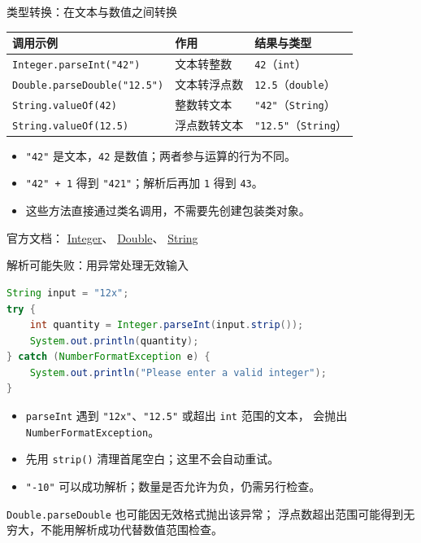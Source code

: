 \documentclass[aspectratio=169]{beamer}
\begin{document}
\begin{frame}{类型转换：在文本与数值之间转换}
  \begin{center}
    \renewcommand{\arraystretch}{1.35}
    \begin{tabular}{lll}
      \textbf{调用示例} & \textbf{作用} & \textbf{结果与类型} \\
      \hline
      \texttt{Integer.parseInt("42")} & 文本转整数 & \texttt{42}（\texttt{int}） \\
      \texttt{Double.parseDouble("12.5")} & 文本转浮点数 & \texttt{12.5}（\texttt{double}） \\
      \texttt{String.valueOf(42)} & 整数转文本 & \texttt{"42"}（\texttt{String}） \\
      \texttt{String.valueOf(12.5)} & 浮点数转文本 & \texttt{"12.5"}（\texttt{String}） \\
    \end{tabular}
  \end{center}
  \medskip
  \begin{itemize}
    \item \texttt{"42"} 是文本，\texttt{42} 是数值；两者参与运算的行为不同。
    \item \texttt{"42" + 1} 得到 \texttt{"421"}；解析后再加 \texttt{1} 得到 \texttt{43}。
    \item 这些方法直接通过类名调用，不需要先创建包装类对象。
  \end{itemize}
  \medskip
  {\footnotesize 官方文档：
  \href{https://docs.oracle.com/en/java/javase/25/docs/api/java.base/java/lang/Integer.html}{Integer}、
  \href{https://docs.oracle.com/en/java/javase/25/docs/api/java.base/java/lang/Double.html}{Double}、
  \href{https://docs.oracle.com/en/java/javase/25/docs/api/java.base/java/lang/String.html}{String}}
\end{frame}

\begin{frame}[fragile]{解析可能失败：用异常处理无效输入}
  \begin{lstlisting}[language=Java]
String input = "12x";
try {
    int quantity = Integer.parseInt(input.strip());
    System.out.println(quantity);
} catch (NumberFormatException e) {
    System.out.println("Please enter a valid integer");
}
  \end{lstlisting}
  \begin{itemize}
    \item \texttt{parseInt} 遇到 \texttt{"12x"}、\texttt{"12.5"} 或超出 \texttt{int} 范围的文本，
      会抛出 \texttt{NumberFormatException}。
    \item 先用 \texttt{strip()} 清理首尾空白；这里不会自动重试。
    \item \texttt{"-10"} 可以成功解析；数量是否允许为负，仍需另行检查。
  \end{itemize}
  \medskip
  {\footnotesize\texttt{Double.parseDouble} 也可能因无效格式抛出该异常；
  浮点数超出范围可能得到无穷大，不能用解析成功代替数值范围检查。}
\end{frame}
\end{document}
